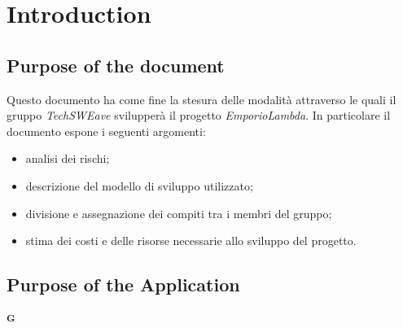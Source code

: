 \section{Introduction}
\subsection{Purpose of the document}
Questo documento ha come fine la stesura delle modalità attraverso le quali il gruppo \emph{TechSWEave} svilupperà il progetto \emph{EmporioLambda}. In particolare il documento espone i seguenti argomenti:
\begin{itemize}
    \item analisi dei rischi;
    \item descrizione del modello di sviluppo utilizzato;
    \item divisione e assegnazione dei compiti tra i membri del gruppo;
    \item stima dei costi e delle risorse necessarie allo sviluppo del progetto.
\end{itemize}
\subsection{Purpose of the Application}
\textsubscript{\textbf{G}}
